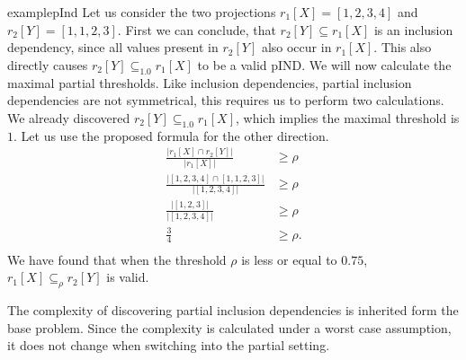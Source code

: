 \begin{restatable}{example}{pInd}\label{exmp:pInd}
    Let us consider the two projections $r_1[X] = [1, 2, 3, 4]$ and $r_2[Y] = [1, 1, 2, 3]$. First we can conclude, that $r_2[Y] \subseteq r_1[X]$ is an inclusion dependency, since all values present in $r_2[Y]$ also occur in $r_1[X]$. This also directly causes $r_2[Y] \subseteq_{1.0} r_1[X]$ to be a valid pIND. We will now calculate the maximal partial thresholds. Like inclusion dependencies, partial inclusion dependencies are not symmetrical, this requires us to perform two calculations. We already discovered $r_2[Y] \subseteq_{1.0} r_1[X]$, which implies the maximal threshold is $1$. Let us use the proposed formula for the other direction.
    \begin{align*}
        \frac{|r_1[X] \cap r_2[Y]|}
            {|r_1[X]|} & \geq \rho \\
        \frac{|[1, 2, 3, 4] \cap [1, 1, 2, 3]|}
            {|[1, 2, 3, 4]|} & \geq \rho \\ 
        \frac{|[1, 2, 3]|}
            {|[1, 2, 3, 4]|} & \geq \rho \\
        \frac{3}{4} & \geq \rho. \\ 
    \end{align*}
    We have found that when the threshold $\rho$ is less or equal to $0.75$, $r_1[X] \subseteq_{\rho} r_2[Y]$ is valid.
\end{restatable}

\noindent The complexity of discovering partial inclusion dependencies is inherited form the base problem. Since the complexity is calculated under a worst case assumption, it does not change when switching into the partial setting.

